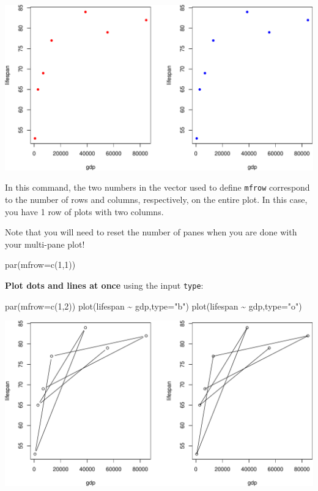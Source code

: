 \documentclass[
]{book}
\newenvironment{Shaded}{\begin{snugshade}}{\end{snugshade}}
\newcommand{\AttributeTok}[1]{\textcolor[rgb]{0.77,0.63,0.00}{#1}}
\newcommand{\DecValTok}[1]{\textcolor[rgb]{0.00,0.00,0.81}{#1}}
\newcommand{\FunctionTok}[1]{\textcolor[rgb]{0.00,0.00,0.00}{#1}}
\newcommand{\NormalTok}[1]{#1}
\newcommand{\SpecialCharTok}[1]{\textcolor[rgb]{0.00,0.00,0.00}{#1}}
\newcommand{\StringTok}[1]{\textcolor[rgb]{0.31,0.60,0.02}{#1}}
\begin{document}
\includegraphics{figures/unnamed-chunk-110-1.pdf}

In this command, the two numbers in the vector used to define \texttt{mfrow} correspond to the number of rows and columns, respectively, on the entire plot. In this case, you have 1 row of plots with two columns.

Note that you will need to reset the number of panes when you are done with your multi-pane plot!

\begin{Shaded}
\begin{Highlighting}[]
\FunctionTok{par}\NormalTok{(}\AttributeTok{mfrow=}\FunctionTok{c}\NormalTok{(}\DecValTok{1}\NormalTok{,}\DecValTok{1}\NormalTok{))}
\end{Highlighting}
\end{Shaded}

\textbf{Plot dots and lines at once} using the input \texttt{type}:

\begin{Shaded}
\begin{Highlighting}[]
\FunctionTok{par}\NormalTok{(}\AttributeTok{mfrow=}\FunctionTok{c}\NormalTok{(}\DecValTok{1}\NormalTok{,}\DecValTok{2}\NormalTok{))}
\FunctionTok{plot}\NormalTok{(lifespan }\SpecialCharTok{\textasciitilde{}}\NormalTok{ gdp,}\AttributeTok{type=}\StringTok{"b"}\NormalTok{)}
\FunctionTok{plot}\NormalTok{(lifespan }\SpecialCharTok{\textasciitilde{}}\NormalTok{ gdp,}\AttributeTok{type=}\StringTok{"o"}\NormalTok{)}
\end{Highlighting}
\end{Shaded}

\includegraphics{figures/unnamed-chunk-112-1.pdf}
\end{document}
